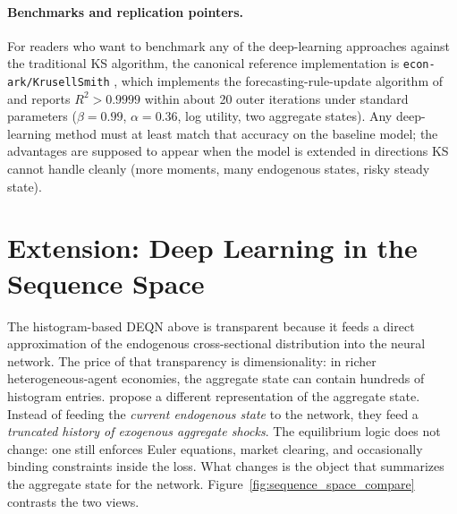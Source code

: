 \documentclass[11pt,a4paper]{report}
\begin{document}
\paragraph{Benchmarks and replication pointers.}  For readers who want to benchmark any of the deep-learning approaches against the traditional KS algorithm, the canonical reference implementation is \texttt{econ-ark/KrusellSmith} \citep{econark2020ks}, which implements the forecasting-rule-update algorithm of \citet{krusell1998income} and reports $R^2 > 0.9999$ within about 20 outer iterations under standard parameters ($\beta = 0.99$, $\alpha = 0.36$, log utility, two aggregate states).  Any deep-learning method must at least match that accuracy on the baseline model; the advantages are supposed to appear when the model is extended in directions KS cannot handle cleanly (more moments, many endogenous states, risky steady state).

\section{Extension: Deep Learning in the Sequence Space}
\label{sec:sequence_space}

The histogram-based DEQN above is transparent because it feeds a direct approximation of the endogenous cross-sectional distribution into the neural network.  The price of that transparency is dimensionality: in richer heterogeneous-agent economies, the aggregate state can contain hundreds of histogram entries.  \citet{azinovicyangzemlicka2025sequencespace} propose a different representation of the aggregate state.  Instead of feeding the \emph{current endogenous state} to the network, they feed a \emph{truncated history of exogenous aggregate shocks}.  The equilibrium logic does not change: one still enforces Euler equations, market clearing, and occasionally binding constraints inside the loss.  What changes is the object that summarizes the aggregate state for the network.  Figure~\ref{fig:sequence_space_compare} contrasts the two views.
\end{document}
